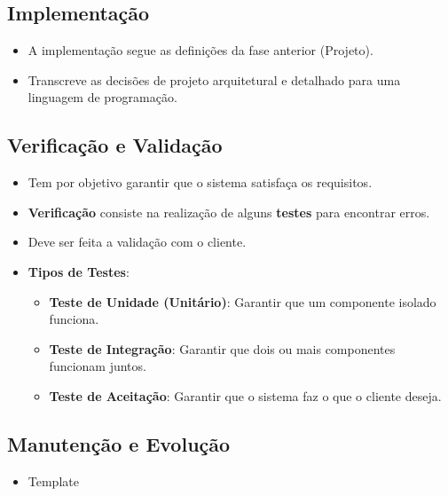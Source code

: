 \documentclass[a4paper, 11pt]{article}
\begin{document}
\subsection{Implementação}
\begin{itemize}
	\item A implementação segue as definições da fase anterior (Projeto).
	\item Transcreve as decisões de projeto arquitetural e detalhado para uma linguagem de programação.
\end{itemize}

\subsection{Verificação e Validação}
\begin{itemize}
	\item Tem por objetivo garantir que o sistema satisfaça os requisitos.
	\item \textbf{Verificação} consiste na realização de alguns \textbf{testes} para encontrar erros.
	\item Deve ser feita a validação com o cliente.
	\item \textbf{Tipos de Testes}:
	\begin{itemize}
		\item \textbf{Teste de Unidade (Unitário)}: Garantir que um componente isolado funciona.
		\item \textbf{Teste de Integração}: Garantir que dois ou mais componentes funcionam juntos.
		\item \textbf{Teste de Aceitação}: Garantir que o sistema faz o que o cliente deseja.
	\end{itemize}
\end{itemize}

\subsection{Manutenção e Evolução}


\begin{itemize}
	\item Template
\end{itemize}
\end{document}
